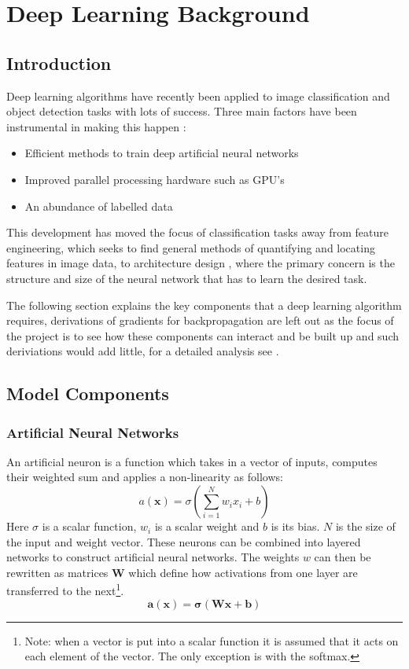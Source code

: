 \chapter{Deep Learning Background} \label{chapter:deep}
  \section{Introduction}
    Deep learning algorithms have recently been applied to image classification
    and object detection tasks with lots of success. \cite{Girshick2014,Krizhevsky2012}
    Three main factors have been instrumental in making this happen \cite{Jaiswal2016}:
    \begin{itemize}
      \item Efficient methods to train deep artificial neural networks
      \item Improved parallel processing hardware such as GPU's
      \item An abundance of labelled data
    \end{itemize}
    This development has moved the focus of classification tasks away from feature engineering,
    which seeks to find general methods of quantifying and locating features in image data, to
    architecture design \cite{StephenMerity2016}, where the primary concern is the structure and size of the neural network that has to
    learn the desired task.

    The following section explains the key components that a deep learning algorithm requires,
    derivations of gradients for backpropagation are left out as the focus of the project is to
    see how these components can interact and be built up and such deriviations would add little,
    for a detailed analysis see \cite{Bishop1995}.
  \section{Model Components}
    \subsection{Artificial Neural Networks}
      An artificial neuron is a function which takes in a vector of inputs, computes their
      weighted sum and applies a non-linearity as follows:
      \begin{equation}
        a(\mathbf{x}) = \sigma \left ( \sum_{i=1}^N w_ix_i + b \right )
      \end{equation}
      Here $\sigma$ is a scalar function, $w_i$ is a scalar weight and $b$ is its bias. $N$ is the size of the input and weight vector.
      These neurons can be combined into layered networks to construct artificial neural networks.
      The weights $w$ can then be rewritten as matrices $\mathbf{W}$ which define how
      activations from one layer are transferred to the next\footnote{Note: when a vector
      is put into a scalar function it is assumed that it acts on each element of
      the vector. The only exception is with the softmax.}.
      \begin{equation}
        \mathbf{a}(\mathbf{x}) = \mathbf{\sigma} \left ( \mathbf{W}\mathbf{x} + \mathbf{b} \right ) \label{eq:softmax}
      \end{equation}


